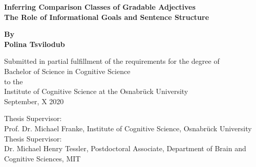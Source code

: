 \begin{titlepage}
	\begin{center}
		\vspace*{1cm}
		\Huge
		\textbf{Inferring Comparison Classes of Gradable Adjectives\\} 
		\vspace{0.5cm}
		\Large
		\textbf{The Role of Informational Goals and Sentence Structure}
		
		\vspace{1cm}
		
	
		\textbf{By \\ Polina Tsvilodub}
		
		\vspace{1cm}
		\small
		Submitted in partial fulfillment of the requirements for the degree of \\
		Bachelor of Science in Cognitive Science \\ to the \\
		Institute of Cognitive Science at the Osnabrück University\\
		September, X 2020
		
		\vfill
		\vspace{1cm}
		Thesis Supervisor:\\ Prof. Dr. Michael Franke, Institute of Cognitive Science, Osnabrück University \\
		\vspace{0.5cm}
		Thesis Supervisor:\\ Dr. Michael Henry Tessler, Postdoctoral Associate, Department of Brain and Cognitive Sciences, MIT  
		
		
		
	\end{center}
\end{titlepage}